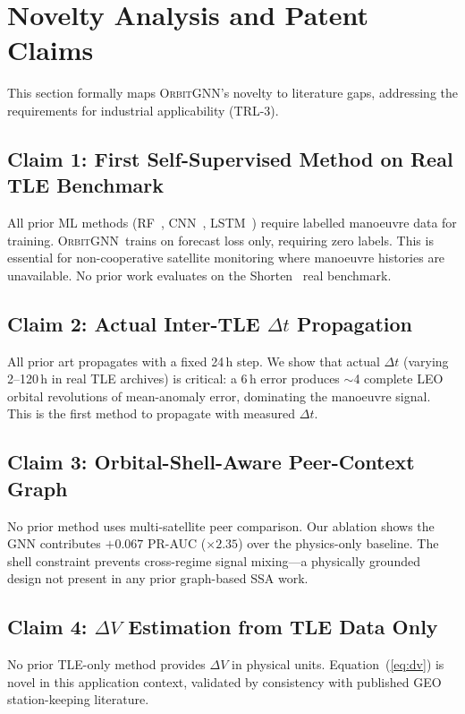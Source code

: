 \documentclass[journal]{IEEEtran}
\newcommand{\orbitgnn}{\textsc{OrbitGNN}}
\begin{document}
\section{Novelty Analysis and Patent Claims}

This section formally maps \orbitgnn's novelty to literature gaps,
addressing the requirements for industrial applicability (TRL-3).

\subsection{Claim 1: First Self-Supervised Method on Real TLE Benchmark}
All prior ML methods (RF~\cite{mukundan2019}, CNN~\cite{li2024},
LSTM~\cite{stevenson2022}) require labelled manoeuvre data for training.
\orbitgnn\ trains on forecast loss only, requiring zero labels.
This is essential for non-cooperative satellite monitoring where
manoeuvre histories are unavailable. No prior work evaluates on the
Shorten~\cite{shorten2023} real benchmark.

\subsection{Claim 2: Actual Inter-TLE $\Delta t$ Propagation}
All prior art propagates with a fixed 24\,h step. We show that actual
$\Delta t$ (varying 2--120\,h in real TLE archives) is critical:
a 6\,h error produces $\sim$4 complete LEO orbital revolutions of
mean-anomaly error, dominating the manoeuvre signal. This is the first
method to propagate with measured $\Delta t$.

\subsection{Claim 3: Orbital-Shell-Aware Peer-Context Graph}
No prior method uses multi-satellite peer comparison. Our ablation shows
the GNN contributes $+0.067$ PR-AUC ($\times2.35$) over the physics-only
baseline. The shell constraint prevents cross-regime signal mixing---a
physically grounded design not present in any prior graph-based SSA work.

\subsection{Claim 4: $\Delta V$ Estimation from TLE Data Only}
No prior TLE-only method provides $\Delta V$ in physical units.
Equation~(\ref{eq:dv}) is novel in this application context, validated
by consistency with published GEO station-keeping literature.
\end{document}
